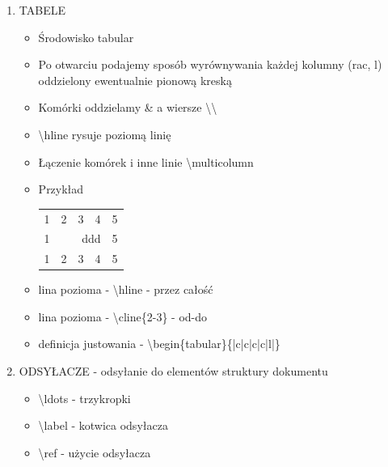 \documentclass[a4paper,twoside,onecolumn]{report}
\begin{document}
\begin{enumerate}
			\item TABELE
			\begin{itemize}
				\item Środowisko tabular
				\item Po otwarciu podajemy sposób wyrównywania każdej kolumny (rac, l) oddzielony ewentualnie pionową kreską
				\item Komórki oddzielamy \& a wiersze \textbackslash \textbackslash
				\item \textbackslash hline rysuje poziomą linię 
				\item Łączenie komórek i inne linie \textbackslash multicolumn
				\item Przykład \\
					\begin{tabular}{|c|c|c|c|l|}
						\hline
						1 & 2 & 3 & 4 & 5 \\
						\cline{2-5}
						1 & \multicolumn{3}{|r|}{ddd} & 5 \\
						\cline{2-5}
						1 & 2 & 3 & 4 & 5 \\
						\hline
					\end{tabular}
				\item lina pozioma - \textbackslash hline - przez całość
				\item lina pozioma - \textbackslash cline\{2-3\} - od-do
				\item definicja justowania - \textbackslash begin\{tabular\}\{|c|c|c|c|l|\}
			\end{itemize}

			\item ODSYŁACZE - odsyłanie do elementów struktury dokumentu
			\begin{itemize}
				\item \textbackslash ldots - trzykropki
				\item \textbackslash label - kotwica odsyłacza
				\item \textbackslash ref - użycie odsyłacza
			\end{itemize}


\end{enumerate}
\end{document}
